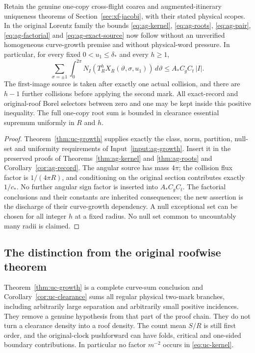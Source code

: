 \begin{corollary}
\label{cor:uc-clearance}
Retain the genuine one-copy cross-flight coarea and augmented-itinerary
uniqueness theorems of Section~\ref{sec:xf-jacobi}, with their stated
physical scopes. In the original Lorentz family the bounds
\eqref{eq:ag-kernel}, \eqref{eq:ag-roots}, \eqref{eq:ag-pair},
\eqref{eq:ag-factorial} and \eqref{eq:ag-exact-source} now follow
without an unverified homogeneous curve-growth premise and without
physical-word pressure. In particular, for every fixed
$0<u_1\le\delta_*$ and every $h\ge1$,
\begin{equation}\label{eq:uc-kernel}
 \sum_{\sigma=\pm1}\int_0^{2\pi}
    N_I(T_R^h X_R(\vartheta,\sigma,u_1))\,d\vartheta
                 \le A_*C_g C_t\,|I|.
\end{equation}
The first-image source is taken after exactly one actual collision, and
there are $h-1$ further collisions before applying the second mark.
All exact-record and original-roof Borel selectors between zero and one
may be kept inside this positive inequality. The full one-copy root sum
is bounded in clearance essential supremum uniformly in $R$ and $h$.
\end{corollary}
\begin{proof}
Theorem~\ref{thm:uc-growth} supplies exactly the class, norm, partition,
null-set and uniformity requirements of Input~\ref{input:ag-growth}.
Insert it in the preserved proofs of Theorems~\ref{thm:ag-kernel} and
\ref{thm:ag-roots} and Corollary~\ref{cor:ag-record}. The angular source
has mass $4\pi$; the collision flux factor is $1/(4\pi R)$, and
conditioning on the original section contributes exactly $1/c_*$.
No further angular sign factor is inserted into $A_*C_gC_t$.
The factorial conclusions and their constants are inherited consequences;
the new assertion is the discharge of their curve-growth dependency.
A null exceptional set can be chosen for all integer $h$ at a fixed
radius. No null set common to uncountably many radii is claimed.
\end{proof}

\subsection*{The distinction from the original roofwise theorem}
Theorem~\ref{thm:uc-growth} is a complete curve-sum conclusion and
Corollary~\ref{cor:uc-clearance} sums all regular physical two-mark
branches, including arbitrarily large separation and arbitrarily small
positive incidences. They remove a genuine hypothesis from that part of
the proof chain. They do not turn a clearance density into a roof density.
The count mean $S/R$ is still first order, and the original-clock
pushforward can have folds, critical and one-sided boundary contributions.
In particular no factor $m^{-2}$ occurs in \eqref{eq:uc-kernel}.

